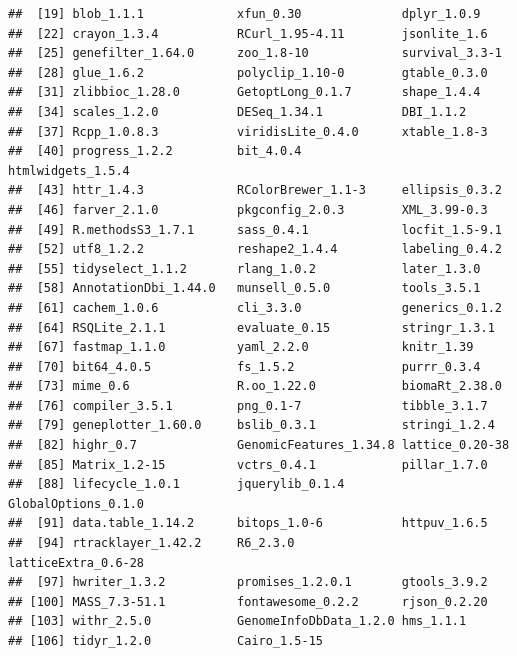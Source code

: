 \documentclass[]{article}
\begin{document}
\begin{verbatim}
##  [19] blob_1.1.1             xfun_0.30              dplyr_1.0.9           
##  [22] crayon_1.3.4           RCurl_1.95-4.11        jsonlite_1.6          
##  [25] genefilter_1.64.0      zoo_1.8-10             survival_3.3-1        
##  [28] glue_1.6.2             polyclip_1.10-0        gtable_0.3.0          
##  [31] zlibbioc_1.28.0        GetoptLong_0.1.7       shape_1.4.4           
##  [34] scales_1.2.0           DESeq_1.34.1           DBI_1.1.2             
##  [37] Rcpp_1.0.8.3           viridisLite_0.4.0      xtable_1.8-3          
##  [40] progress_1.2.2         bit_4.0.4              htmlwidgets_1.5.4     
##  [43] httr_1.4.3             RColorBrewer_1.1-3     ellipsis_0.3.2        
##  [46] farver_2.1.0           pkgconfig_2.0.3        XML_3.99-0.3          
##  [49] R.methodsS3_1.7.1      sass_0.4.1             locfit_1.5-9.1        
##  [52] utf8_1.2.2             reshape2_1.4.4         labeling_0.4.2        
##  [55] tidyselect_1.1.2       rlang_1.0.2            later_1.3.0           
##  [58] AnnotationDbi_1.44.0   munsell_0.5.0          tools_3.5.1           
##  [61] cachem_1.0.6           cli_3.3.0              generics_0.1.2        
##  [64] RSQLite_2.1.1          evaluate_0.15          stringr_1.3.1         
##  [67] fastmap_1.1.0          yaml_2.2.0             knitr_1.39            
##  [70] bit64_4.0.5            fs_1.5.2               purrr_0.3.4           
##  [73] mime_0.6               R.oo_1.22.0            biomaRt_2.38.0        
##  [76] compiler_3.5.1         png_0.1-7              tibble_3.1.7          
##  [79] geneplotter_1.60.0     bslib_0.3.1            stringi_1.2.4         
##  [82] highr_0.7              GenomicFeatures_1.34.8 lattice_0.20-38       
##  [85] Matrix_1.2-15          vctrs_0.4.1            pillar_1.7.0          
##  [88] lifecycle_1.0.1        jquerylib_0.1.4        GlobalOptions_0.1.0   
##  [91] data.table_1.14.2      bitops_1.0-6           httpuv_1.6.5          
##  [94] rtracklayer_1.42.2     R6_2.3.0               latticeExtra_0.6-28   
##  [97] hwriter_1.3.2          promises_1.2.0.1       gtools_3.9.2          
## [100] MASS_7.3-51.1          fontawesome_0.2.2      rjson_0.2.20          
## [103] withr_2.5.0            GenomeInfoDbData_1.2.0 hms_1.1.1             
## [106] tidyr_1.2.0            Cairo_1.5-15
\end{verbatim}
\end{document}
